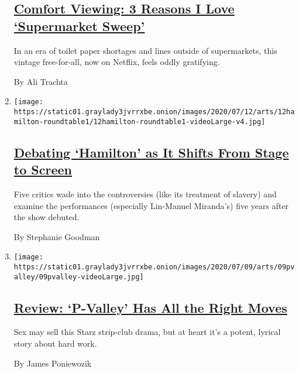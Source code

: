 \begin{enumerate}
  \hypertarget{comfort-viewing-3-reasons-i-love-supermarket-sweep}{%
  \subsection{\texorpdfstring{\href{/2020/07/17/arts/television/supermarket-sweep-netflix-amazon.html}{Comfort
  Viewing: 3 Reasons I Love `Supermarket
  Sweep'}}{Comfort Viewing: 3 Reasons I Love `Supermarket Sweep'}}\label{comfort-viewing-3-reasons-i-love-supermarket-sweep}}

  In an era of toilet paper shortages and lines outside of supermarkets,
  this vintage free-for-all, now on Netflix, feels oddly gratifying.

  By Ali Trachta
\item
  \texttt{[image: https://static01.graylady3jvrrxbe.onion/images/2020/07/12/arts/12hamilton-roundtable1/12hamilton-roundtable1-videoLarge-v4.jpg]}

  \hypertarget{debating-hamilton-as-it-shifts-from-stage-to-screen}{%
  \subsection{\texorpdfstring{\href{/2020/07/10/movies/hamilton-critics-lin-manuel-miranda.html}{Debating
  `Hamilton' as It Shifts From Stage to
  Screen}}{Debating `Hamilton' as It Shifts From Stage to Screen}}\label{debating-hamilton-as-it-shifts-from-stage-to-screen}}

  Five critics wade into the controversies (like its treatment of
  slavery) and examine the performances (especially Lin-Manuel
  Miranda's) five years after the show debuted.

  By Stephanie Goodman
\item
  \texttt{[image: https://static01.graylady3jvrrxbe.onion/images/2020/07/09/arts/09pvalley/09pvalley-videoLarge.jpg]}

  \hypertarget{review-p-valley-has-all-the-right-moves}{%
  \subsection{\texorpdfstring{\href{/2020/07/09/arts/television/p-valley-review-starz.html}{Review:
  `P-Valley' Has All the Right
  Moves}}{Review: `P-Valley' Has All the Right Moves}}\label{review-p-valley-has-all-the-right-moves}}

  Sex may sell this Starz strip-club drama, but at heart it's a potent,
  lyrical story about hard work.

  By James Poniewozik
\end{enumerate}

